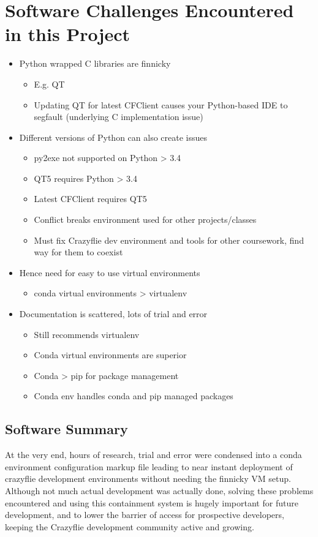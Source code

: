 \documentclass[12pt]{article}
\begin{document}
\section{Software Challenges Encountered in this Project}
	\begin{itemize}
		\item Python wrapped C libraries are finnicky
			\begin{itemize}
				\item E.g. QT 
				\item Updating QT for latest CFClient causes your Python-based IDE to segfault (underlying C implementation issue)
			\end{itemize}
		\item Different versions of Python can also create issues
			\begin{itemize}
				\item py2exe not supported on Python > 3.4
				\item QT5 requires Python > 3.4
				\item Latest CFClient requires QT5
				\item Conflict breaks environment used for other projects/classes
				\item Must fix Crazyflie dev environment and tools for other coursework, find way for them to coexist
			\end{itemize}
		\item Hence need for easy to use virtual environments
			\begin{itemize}
				\item conda virtual environments > virtualenv
			\end{itemize}
		\item Documentation is scattered, lots of trial and error
			\begin{itemize}
				\item Still recommends virtualenv
				\item Conda virtual environments are superior
				\item Conda > pip for package management
				\item Conda env handles conda and pip managed packages
			\end{itemize}
	\end{itemize}

\subsection{Software Summary}
At the very end, hours of research, trial and error were condensed into a conda environment configuration markup file leading to near instant deployment of crazyflie development environments without needing the finnicky VM setup. Although not much actual development was actually done, solving these problems encountered and using this containment system is hugely important for future development, and to lower the barrier of access for prospective developers, keeping the Crazyflie development community active and growing.
\end{document}
